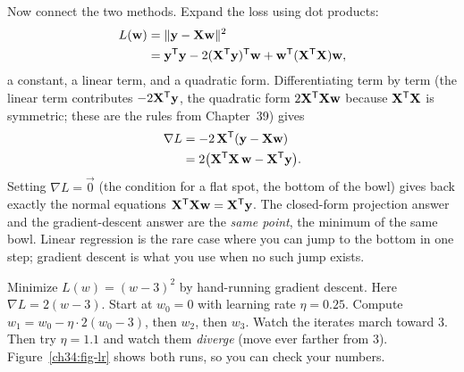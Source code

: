 Now connect the two methods. Expand the loss using dot products:
\begin{align*}
L(\mathbf{w}) &= \lVert\mathbf{y}-\mathbf{X}\mathbf{w}\rVert^2 \\
&= \mathbf{y}^{\mathsf{T}}\mathbf{y}-2(\mathbf{X}^{\mathsf{T}}\mathbf{y})^{\mathsf{T}}\mathbf{w}+\mathbf{w}^{\mathsf{T}}(\mathbf{X}^{\mathsf{T}}\mathbf{X})\mathbf{w},
\end{align*}
a constant, a linear term, and a quadratic form. Differentiating term by term (the
linear term contributes $-2\mathbf{X}^{\mathsf{T}}\mathbf{y}$, the quadratic form
$2\mathbf{X}^{\mathsf{T}}\mathbf{X}\mathbf{w}$ because $\mathbf{X}^{\mathsf{T}}\mathbf{X}$ is symmetric; these are the rules from
Chapter~39) gives
\begin{align*}
\nabla L &= -2\,\mathbf{X}^{\mathsf{T}}(\mathbf{y}-\mathbf{X}\mathbf{w}) \\
&= 2\big(\mathbf{X}^{\mathsf{T}}\mathbf{X}\,\mathbf{w}-\mathbf{X}^{\mathsf{T}}\mathbf{y}\big).
\end{align*}
Setting $\nabla L = \vec{0}$ (the condition for a flat spot, the bottom of the bowl)
gives back exactly the normal equations $\mathbf{X}^{\mathsf{T}}\mathbf{X}\mathbf{w}=\mathbf{X}^{\mathsf{T}}\mathbf{y}$. The
closed-form projection answer and the gradient-descent answer are the \emph{same point},
the minimum of the same bowl. Linear regression is the rare case where you can jump to the
bottom in one step; gradient descent is what you use when no such jump exists.

\begin{labbox}
Minimize $L(w)=(w-3)^2$ by hand-running gradient descent. Here $\nabla L = 2(w-3)$. Start
at $w_0=0$ with learning rate $\eta=0.25$. Compute $w_1=w_0-\eta\cdot 2(w_0-3)$, then
$w_2$, then $w_3$. Watch the iterates march toward $3$. Then try $\eta=1.1$ and watch them
\emph{diverge} (move ever farther from $3$). Figure~\ref{ch34:fig-lr} shows both runs, so
you can check your numbers.
\end{labbox}

